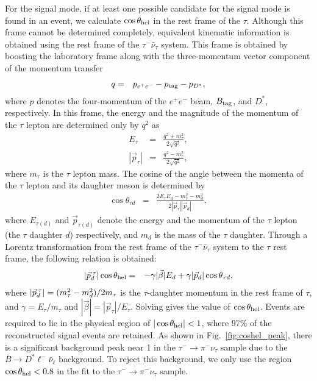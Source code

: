\documentclass[aps,prd,twocolumn,superscriptaddress,showpacs,preprintnumbers,amsmath,amssymb]{revtex4-1}
\begin{document}
For the signal mode, if at least one possible candidate for the signal mode is found in an event, we calculate $\cos \theta_{\rm hel}$ in the rest frame of the $\tau$. Although this frame cannot be determined completely, equivalent kinematic information is obtained using the rest frame of the $\tau^- \bar{\nu}_\tau$ system. This frame is obtained by boosting the laboratory frame along with the three-momentum vector component of the momentum transfer
\begin{eqnarray}
  q &=& p_{e^+ e^-} - p_{\rm tag} - p_{D^*},
\end{eqnarray}
where $p$ denotes the four-momentum of the $e^+ e^-$ beam, $B_{\rm tag}$, and $D^*$, respectively. In this frame, the energy and the magnitude of the momentum of the $\tau$ lepton are determined only by $q^2$ as
\begin{eqnarray}
  E_\tau           &=& \frac{q^2 + m_{\tau}^2}{2 \sqrt{q^2}},\\
  |\vec{p}_{\tau}| &=& \frac{q^2 - m_{\tau}^2}{2 \sqrt{q^2}},
\end{eqnarray}
where $m_\tau$ is the $\tau$ lepton mass. The cosine of the angle between the momenta of the $\tau$ lepton and its daughter meson is determined by
\begin{eqnarray}
  \cos \theta_{\tau d} &=& \frac{2 E_\tau E_d - m_{\tau}^2 - m_d^2} {2 |\vec{p}_{\tau}||\vec{p}_d|},
\end{eqnarray}
where $E_{\tau(d)}$ and $\vec{p}_{\tau(d)}$ denote the energy and the momentum of the $\tau$ lepton (the $\tau$ daughter $d$) respectively, and $m_d$ is the mass of the $\tau$ daughter. Through a Lorentz transformation from the rest frame of the $\tau^- \bar{\nu}_\tau$ system to the $\tau$ rest frame, the following relation is obtained:
\begin{eqnarray}
  |\vec{p}_d^{\kern2pt \tau}| \cos\theta_{\rm hel} &=& -\gamma |\vec{\beta}| E_d + \gamma |\vec{p}_d| \cos\theta_{\tau d},
\end{eqnarray}
where $|\vec{p}_d^{\kern2pt \tau}| = (m_\tau^2 - m_d^2) / 2 m_\tau$ is the $\tau$-daughter momentum in the rest frame of $\tau$, and $\gamma = E_\tau / m_\tau$ and $|\vec{\beta}| = |\vec{p}_\tau| / E_\tau$. Solving gives the value of $\cos \theta_{\rm hel}$. Events are required to lie in the physical region of $|\cos\theta_{\rm hel}| < 1$, where 97\% of the reconstructed signal events are retained. As shown in Fig.~\ref{fig:coshel_peak}, there is a significant background peak near 1 in the $\tau^- \rightarrow \pi^- \nu_\tau$ sample due to the $\bar{B} \rightarrow D^* \ell^- \bar{\nu}_\ell$ background. To reject this background, we only use the region $\cos\theta_{\rm hel} < 0.8$ in the fit to the $\tau^- \rightarrow \pi^- \nu_\tau$ sample.
\end{document}
